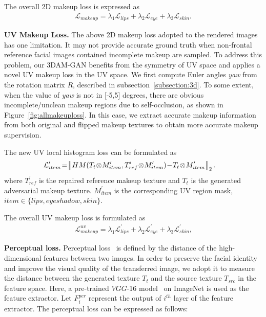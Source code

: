 \documentclass[10pt,journal,compsoc]{IEEEtran}
\begin{document}
The overall 2D makeup loss is expressed as
\begin{equation}
	\begin{aligned}
\mathcal{L}_{makeup}=\lambda_{1}\mathcal{L}_{lips}+\lambda_{2}\mathcal{L}_{eye}+\lambda_{3}\mathcal{L}_{skin} \text{.}
	\end{aligned}
	\label{con:makeuploss}
\end{equation}

{\bf UV Makeup Loss.}
The above 2D makeup loss adopted to the rendered images has one limitation. It may not provide accurate ground truth when non-frontal reference facial images contained incomplete makeup are sampled. To address this problem, our 3DAM-GAN benefits from the symmetry of UV space and applies a novel UV makeup loss in the UV space. 
We first compute Euler angles \emph{yaw} from the rotation matrix $R$, described in subsection~\ref{subsection:3d}. 
To some extent, when the value of \emph{yaw} is not in [-5,5] degrees, there are obvious incomplete/unclean makeup regions due to self-occlusion, as shown in Figure~\ref{fig:allmakeuploss}. In this case, we extract accurate makeup information from both original and flipped makeup textures to obtain more accurate makeup supervision. 

The new UV local histogram loss can be formulated as 
\begin{equation}
	\begin{aligned}
		\hspace{-3.5mm}\mathcal{L}^{\prime}_{item}\!=\!\left\|HM(T_{t}\!\otimes\!M^{\prime}_{item},T^{\prime}_{ref}\!\otimes\!M^{\prime}_{item})\!-\!T_{t}\!\otimes\!M^{\prime}_{item}\right\|_{2} \text{.}
	\end{aligned}
\end{equation}
where $T^{\prime}_{ref}$ is the repaired reference makeup texture and $T_{t}$ is the generated adversarial makeup texture. $M^{\prime}_{item}$ is the corresponding UV region mask, $item \in \{lips, eye shadow, skin\}$. 

The overall UV makeup loss is formulated as
\begin{equation}
	\begin{aligned}
\mathcal{L}^{uv}_{makeup}=\lambda_{1}\mathcal{L}^{\prime}_{lips}+\lambda_{2}\mathcal{L}^{\prime}_{eye}+\lambda_{3}\mathcal{L}^{\prime}_{skin} \text{,}
	\end{aligned}
	\label{con:sysmakeuploss}
\end{equation}

{\bf Perceptual loss.}
Perceptual loss~\cite{johnson2016perceptual} is defined by the distance of the high-dimensional features between two images. 
In order to preserve the facial identity and improve the visual quality of the transferred image, we adopt it to measure the distance between the generated texture $T_{t}$ and the source texture $T_{src}$ in the feature space. 
Here, a pre-trained $VGG$-16 model~\cite{vgg} on ImageNet is used as the feature extractor. 
Let $F^{per}_i$ represent the output of $i^{th}$ layer of the feature extractor.
The perceptual loss can be expressed as follows: 
\end{document}
